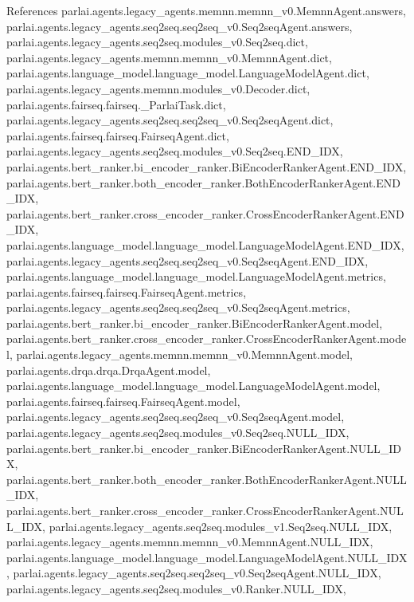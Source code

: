 References parlai.\+agents.\+legacy\+\_\+agents.\+memnn.\+memnn\+\_\+v0.\+Memnn\+Agent.\+answers, parlai.\+agents.\+legacy\+\_\+agents.\+seq2seq.\+seq2seq\+\_\+v0.\+Seq2seq\+Agent.\+answers, parlai.\+agents.\+legacy\+\_\+agents.\+seq2seq.\+modules\+\_\+v0.\+Seq2seq.\+dict, parlai.\+agents.\+legacy\+\_\+agents.\+memnn.\+memnn\+\_\+v0.\+Memnn\+Agent.\+dict, parlai.\+agents.\+language\+\_\+model.\+language\+\_\+model.\+Language\+Model\+Agent.\+dict, parlai.\+agents.\+legacy\+\_\+agents.\+memnn.\+modules\+\_\+v0.\+Decoder.\+dict, parlai.\+agents.\+fairseq.\+fairseq.\+\_\+\+Parlai\+Task.\+dict, parlai.\+agents.\+legacy\+\_\+agents.\+seq2seq.\+seq2seq\+\_\+v0.\+Seq2seq\+Agent.\+dict, parlai.\+agents.\+fairseq.\+fairseq.\+Fairseq\+Agent.\+dict, parlai.\+agents.\+legacy\+\_\+agents.\+seq2seq.\+modules\+\_\+v0.\+Seq2seq.\+E\+N\+D\+\_\+\+I\+DX, parlai.\+agents.\+bert\+\_\+ranker.\+bi\+\_\+encoder\+\_\+ranker.\+Bi\+Encoder\+Ranker\+Agent.\+E\+N\+D\+\_\+\+I\+DX, parlai.\+agents.\+bert\+\_\+ranker.\+both\+\_\+encoder\+\_\+ranker.\+Both\+Encoder\+Ranker\+Agent.\+E\+N\+D\+\_\+\+I\+DX, parlai.\+agents.\+bert\+\_\+ranker.\+cross\+\_\+encoder\+\_\+ranker.\+Cross\+Encoder\+Ranker\+Agent.\+E\+N\+D\+\_\+\+I\+DX, parlai.\+agents.\+language\+\_\+model.\+language\+\_\+model.\+Language\+Model\+Agent.\+E\+N\+D\+\_\+\+I\+DX, parlai.\+agents.\+legacy\+\_\+agents.\+seq2seq.\+seq2seq\+\_\+v0.\+Seq2seq\+Agent.\+E\+N\+D\+\_\+\+I\+DX, parlai.\+agents.\+language\+\_\+model.\+language\+\_\+model.\+Language\+Model\+Agent.\+metrics, parlai.\+agents.\+fairseq.\+fairseq.\+Fairseq\+Agent.\+metrics, parlai.\+agents.\+legacy\+\_\+agents.\+seq2seq.\+seq2seq\+\_\+v0.\+Seq2seq\+Agent.\+metrics, parlai.\+agents.\+bert\+\_\+ranker.\+bi\+\_\+encoder\+\_\+ranker.\+Bi\+Encoder\+Ranker\+Agent.\+model, parlai.\+agents.\+bert\+\_\+ranker.\+cross\+\_\+encoder\+\_\+ranker.\+Cross\+Encoder\+Ranker\+Agent.\+model, parlai.\+agents.\+legacy\+\_\+agents.\+memnn.\+memnn\+\_\+v0.\+Memnn\+Agent.\+model, parlai.\+agents.\+drqa.\+drqa.\+Drqa\+Agent.\+model, parlai.\+agents.\+language\+\_\+model.\+language\+\_\+model.\+Language\+Model\+Agent.\+model, parlai.\+agents.\+fairseq.\+fairseq.\+Fairseq\+Agent.\+model, parlai.\+agents.\+legacy\+\_\+agents.\+seq2seq.\+seq2seq\+\_\+v0.\+Seq2seq\+Agent.\+model, parlai.\+agents.\+legacy\+\_\+agents.\+seq2seq.\+modules\+\_\+v0.\+Seq2seq.\+N\+U\+L\+L\+\_\+\+I\+DX, parlai.\+agents.\+bert\+\_\+ranker.\+bi\+\_\+encoder\+\_\+ranker.\+Bi\+Encoder\+Ranker\+Agent.\+N\+U\+L\+L\+\_\+\+I\+DX, parlai.\+agents.\+bert\+\_\+ranker.\+both\+\_\+encoder\+\_\+ranker.\+Both\+Encoder\+Ranker\+Agent.\+N\+U\+L\+L\+\_\+\+I\+DX, parlai.\+agents.\+bert\+\_\+ranker.\+cross\+\_\+encoder\+\_\+ranker.\+Cross\+Encoder\+Ranker\+Agent.\+N\+U\+L\+L\+\_\+\+I\+DX, parlai.\+agents.\+legacy\+\_\+agents.\+seq2seq.\+modules\+\_\+v1.\+Seq2seq.\+N\+U\+L\+L\+\_\+\+I\+DX, parlai.\+agents.\+legacy\+\_\+agents.\+memnn.\+memnn\+\_\+v0.\+Memnn\+Agent.\+N\+U\+L\+L\+\_\+\+I\+DX, parlai.\+agents.\+language\+\_\+model.\+language\+\_\+model.\+Language\+Model\+Agent.\+N\+U\+L\+L\+\_\+\+I\+DX, parlai.\+agents.\+legacy\+\_\+agents.\+seq2seq.\+seq2seq\+\_\+v0.\+Seq2seq\+Agent.\+N\+U\+L\+L\+\_\+\+I\+DX, parlai.\+agents.\+legacy\+\_\+agents.\+seq2seq.\+modules\+\_\+v0.\+Ranker.\+N\+U\+L\+L\+\_\+\+I\+DX, 